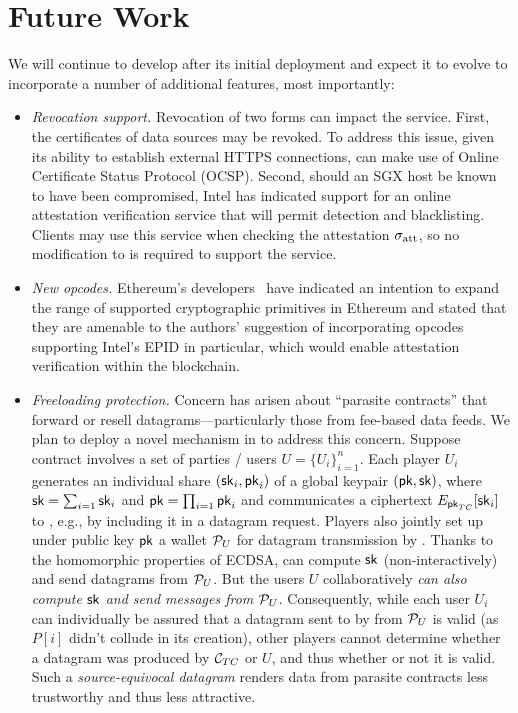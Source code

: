 \section{Future Work}

We will continue to develop \tc after its initial deployment and expect it to evolve to incorporate a number of additional features, most importantly:

\begin{itemize}
\item{\em Revocation support.} Revocation of two forms can impact the \tc service. First, the certificates of data sources may be revoked. To address this issue, given its ability to establish external HTTPS connections, \tc can make use of Online Certificate Status Protocol (OCSP). Second, should an SGX host be known to have been compromised, Intel has indicated support for an online attestation verification service that will permit detection and blacklisting. Clients may use this service when checking the attestation ${\sigma_{\textrm{att}}}$, so no modification to \tc is required to support the service.
\item{\em New opcodes.} Ethereum's developers~\cite{Buterinpersonal} have indicated an intention to expand the range of supported cryptographic primitives in Ethereum and stated that they are amenable to the authors' suggestion of incorporating opcodes supporting Intel's EPID in particular, which would enable attestation verification within the blockchain. 
\item{\em Freeloading protection.} Concern has arisen about ``parasite contracts'' that forward or resell datagrams---particularly those from fee-based data feeds. We plan to deploy a novel mechanism in \tc to address this concern. Suppose contract \reqcont involves a set of parties / users $U = \{U_i\}_{i=1}^n$. Each player $U_i$ generates an individual share $({\sf sk}_i, {\sf pk}_i)$ of a global keypair $({\sf pk}, {\sf sk})$, where ${\sf sk} = \sum_{i=1} {\sf sk}_i$ and ${\sf pk} = \prod_{i=1} {\sf pk}_i$ and communicates a ciphertext $E_{{\sf pk}_{TC}}[{\sf sk}_i]$ to \tcont, e.g., by including it in a datagram request. Players also jointly set  up under public key ${\sf pk}$ a wallet ${\cal P}_U$ for datagram transmission by \tcont. Thanks to the homomorphic properties of ECDSA, \tcont can compute ${\sf sk}$ (non-interactively) and send datagrams from ${\cal P}_U$. But the users $U$ collaboratively \emph{can also compute ${\sf sk}$ and send messages from ${\cal P}_U$}. Consequently, while each user $U_i$ can individually be assured that a datagram sent to \reqcont by \tcont from ${\cal P}_U$ is valid (as $P[i]$ didn't collude in its creation), other players cannot determine whether a datagram was produced by ${\cal C}_{TC}$ or $U$, and thus whether or not it is valid. Such a \emph{source-equivocal datagram} renders data from parasite contracts less trustworthy and thus less attractive. 

\end{itemize}
